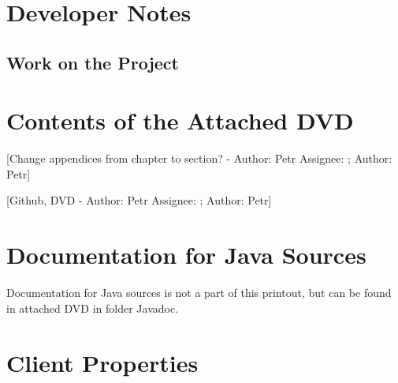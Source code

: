 \documentclass[12pt,a4paper]{report}
\makeatletter
\newcommand{\comment}[3][\@empty]{
  {\color{magenta}[#3 - }
  {\color{green}\ifx\@empty#1\relax Author: #2 \else Assignee: #1; Author: #2\fi}{\color{magenta}]}
}
\makeatother
\begin{document}
\chapter{Developer Notes}
\section{Work on the Project}


\appendix
\chapter{Contents of the Attached DVD}

\comment{Petr}{Change appendices from chapter to section?}

\comment{Petr}{Github, DVD}

\chapter{Documentation for Java Sources}
Documentation for Java sources is not a part of this printout, but can be found
in attached DVD in folder Javadoc.

\chapter{Client Properties}

\label{app:ClientProperties}
\end{document}
